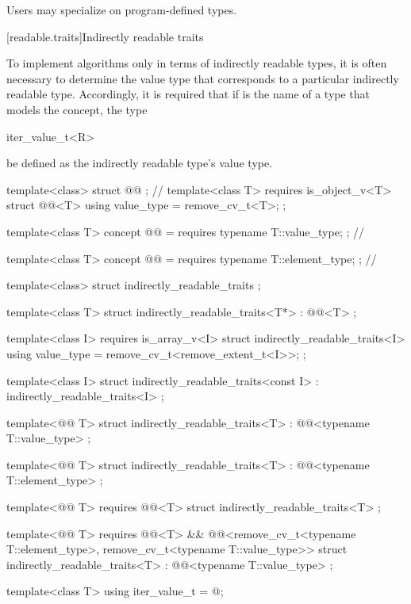 \pnum
Users may specialize  on program-defined types.

[readable.traits]{Indirectly readable traits}

\pnum
To implement algorithms only in terms of indirectly readable types,
it is often necessary
to determine the value type that corresponds to
a particular indirectly readable type.
Accordingly, it is required that if  is the name of a type that
models the  concept,
the type
\begin{codeblock}
iter_value_t<R>
\end{codeblock}
be defined as the indirectly readable type's value type.

%
\begin{codeblock}
template<class> struct @@ { };     // \expos
template<class T>
  requires is_object_v<T>
struct @@<T> {
  using value_type = remove_cv_t<T>;
};

template<class T>
  concept @@ = requires { typename T::value_type; };         // \expos

template<class T>
  concept @@ = requires { typename T::element_type; };     // \expos

template<class> struct indirectly_readable_traits { };

template<class T>
struct indirectly_readable_traits<T*>
  : @@<T> { };

template<class I>
  requires is_array_v<I>
struct indirectly_readable_traits<I> {
  using value_type = remove_cv_t<remove_extent_t<I>>;
};

template<class I>
struct indirectly_readable_traits<const I>
  : indirectly_readable_traits<I> { };

template<@@ T>
struct indirectly_readable_traits<T>
  : @@<typename T::value_type> { };

template<@@ T>
struct indirectly_readable_traits<T>
  : @@<typename T::element_type> { };

template<@@ T>
  requires @@<T>
struct indirectly_readable_traits<T> { };

template<@@ T>
  requires @@<T> &&
           @@<remove_cv_t<typename T::element_type>, remove_cv_t<typename T::value_type>>
struct indirectly_readable_traits<T>
  : @@<typename T::value_type> { };

template<class T> using iter_value_t = @\seebelow@;
\end{codeblock}

